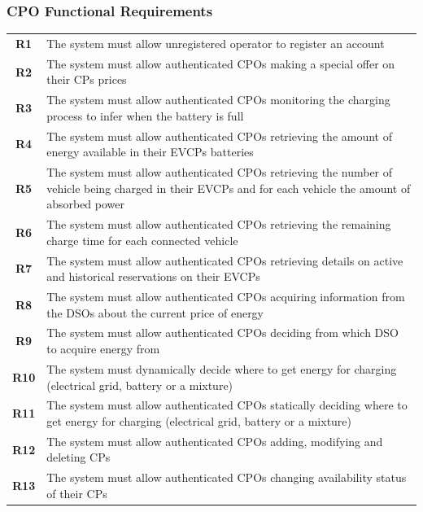 \subsubsection{CPO Functional Requirements}
\begin{table}[H]
    \begin{tabularx}{\textwidth}{cX}
        \toprule
        \textbf{R1}  & The system must allow unregistered operator to register an account                                                                                       \\
        \textbf{R2}  & The system must allow authenticated CPOs making a special offer on their CPs prices                                                                      \\
        \textbf{R3}  & The system must allow authenticated CPOs monitoring the charging process to infer when the battery is full                                               \\
        \textbf{R4}  & The system must allow authenticated CPOs retrieving the amount of energy available in their EVCPs batteries                                              \\
        \textbf{R5}  & The system must allow authenticated CPOs retrieving the number of vehicle being charged in their EVCPs and for each vehicle the amount of absorbed power \\
        \textbf{R6}  & The system must allow authenticated CPOs retrieving the remaining charge time for each connected vehicle                                                 \\
        \textbf{R7}  & The system must allow authenticated CPOs retrieving details on active and historical reservations on their EVCPs                                         \\
        \textbf{R8}  & The system must allow authenticated CPOs acquiring information from the DSOs about the current price of energy                                           \\
        \textbf{R9}  & The system must allow authenticated CPOs deciding from which DSO to acquire energy from                                                                  \\
        \textbf{R10} & The system must dynamically decide where to get energy for charging (electrical grid, battery or a mixture)                                              \\
        \textbf{R11} & The system must allow authenticated CPOs statically deciding where to get energy for charging (electrical grid, battery or a mixture)                    \\
        \textbf{R12} & The system must allow authenticated CPOs adding, modifying and deleting CPs                                                                              \\
        \textbf{R13} & The system must allow authenticated CPOs changing availability status of their CPs                                                                       \\
        \bottomrule
    \end{tabularx}
\end{table}

